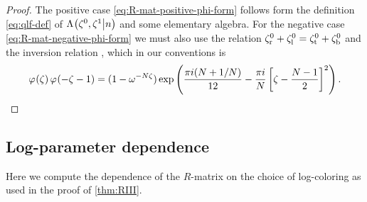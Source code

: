 \documentclass{sl2ams}
\numberwithin{equation}{section}
\begin{document}
\begin{proof}
  The positive case \eqref{eq:R-mat-positive-phi-form} follows form the definition \eqref{eq:qlf-def} of \(\qlf{\zeta^{0}, \zeta^{1}}{n}\) and some elementary algebra.
  For the negative case \eqref{eq:R-mat-negative-phi-form} we must also use the relation \(\zeta_{\mathrm{r}}^{0} + \zeta_{\mathrm{l}}^{0} = \zeta_{\mathrm{t}}^{0} + \zeta_{\mathrm{b}}^{0}\) and the inversion relation \cite[equation (16)]{Faddeev2001}, which in our conventions is
  \begin{equation}
    \label{eq:pf inversion relation}
    \pf{\zeta} \pf{- \zeta - 1} 
    =
    (1 - \omega^{- \nr \zeta})
    \exp\left(
      \frac{
        \pi i (\nr + 1/\nr)
        }{
        12
      }
      - \frac{\pi i}{\nr} \left[ \zeta - \frac{\nr -1}{2} \right]^{2}
    \right)
    .
  \end{equation}

\end{proof}

\subsection{Log-parameter dependence}
\label{sec:log-paramater-dependence}

Here we compute the dependence of the \(R\)-matrix on the choice of log-coloring as used in the proof of \cref{thm:RIII}.
\end{document}
